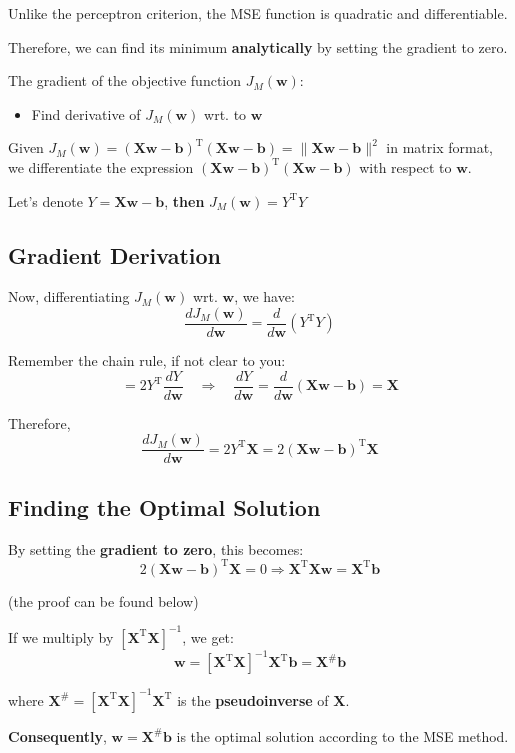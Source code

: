 \documentclass[11pt,a4paper]{article}
\theoremstyle{definition}
\theoremstyle{plain}
\theoremstyle{remark}
\begin{document}
Unlike the perceptron criterion, the MSE function is quadratic and differentiable.

Therefore, we can find its minimum \textbf{analytically} by setting the gradient to zero.

The gradient of the objective function $J_M(\mathbf{w})$:
\begin{itemize}
    \item Find derivative of $J_M(\mathbf{w})$ wrt. to $\mathbf{w}$
\end{itemize}

Given $J_M(\mathbf{w}) = (\mathbf{X}\mathbf{w} - \mathbf{b})^{\mathrm{T}} (\mathbf{X}\mathbf{w} - \mathbf{b}) = \| \mathbf{X}\mathbf{w} - \mathbf{b} \|^2$ in matrix format, we differentiate the expression $(\mathbf{X}\mathbf{w} - \mathbf{b})^{\mathrm{T}} (\mathbf{X}\mathbf{w} - \mathbf{b})$ with respect to $\mathbf{w}$.

Let's denote $Y = \mathbf{X}\mathbf{w} - \mathbf{b}$, \textbf{then} $J_M(\mathbf{w}) = Y^{\mathrm{T}} Y$

\subsection{Gradient Derivation}

Now, differentiating $J_M(\mathbf{w})$ wrt. $\mathbf{w}$, we have:
\[
\frac{dJ_M(\mathbf{w})}{d\mathbf{w}} = \frac{d}{d\mathbf{w}}(Y^{\mathrm{T}}Y)
\]

Remember the chain rule, if not clear to you:
\[
= 2Y^{\mathrm{T}} \frac{dY}{d\mathbf{w}} \quad \Rightarrow \quad \frac{dY}{d\mathbf{w}} = \frac{d}{d\mathbf{w}}(\mathbf{X}\mathbf{w} - \mathbf{b}) = \mathbf{X}
\]

Therefore,
\[
\frac{dJ_M(\mathbf{w})}{d\mathbf{w}} = 2Y^{\mathrm{T}} \mathbf{X} = 2(\mathbf{X}\mathbf{w} - \mathbf{b})^{\mathrm{T}} \mathbf{X}
\]

\subsection{Finding the Optimal Solution}

\begin{tcolorbox}[colback=cyan!10!white,colframe=cyan!75!black,title=\textbf{Pseudoinverse Solution}]
By setting the \textbf{gradient to zero}, this becomes:
\[
2(\mathbf{X}\mathbf{w} - \mathbf{b})^{\mathrm{T}} \mathbf{X} = 0 \Rightarrow \mathbf{X}^{\mathrm{T}} \mathbf{X} \mathbf{w} = \mathbf{X}^{\mathrm{T}} \mathbf{b}
\]

(the proof can be found below)

If we multiply by $[\mathbf{X}^{\mathrm{T}} \mathbf{X}]^{-1}$, we get:
\[
\mathbf{w} = [\mathbf{X}^{\mathrm{T}} \mathbf{X}]^{-1} \mathbf{X}^{\mathrm{T}} \mathbf{b} = \mathbf{X}^{\#} \mathbf{b}
\]

where $\mathbf{X}^{\#} = [\mathbf{X}^{\mathrm{T}} \mathbf{X}]^{-1} \mathbf{X}^{\mathrm{T}}$ is the \textbf{pseudoinverse} of $\mathbf{X}$.

\textbf{Consequently}, $\mathbf{w} = \mathbf{X}^{\#} \mathbf{b}$ is the optimal solution according to the MSE method.
\end{tcolorbox}
\end{document}
